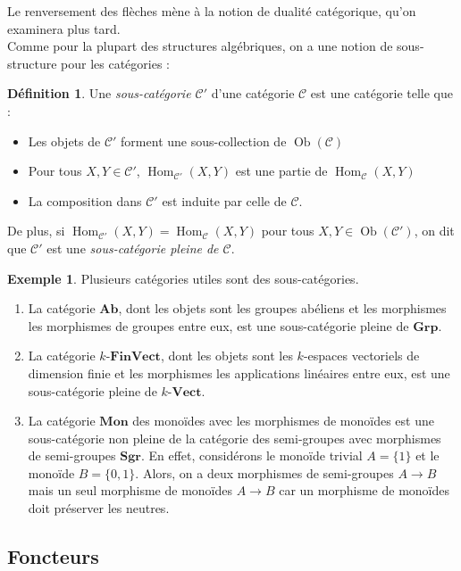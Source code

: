\documentclass{article}
\newcommand{\cat}{\mathcal{C}}
\newcommand{\Grp}{\mathbf{Grp}}
\newcommand{\Ab}{\mathbf{Ab}}
\newcommand{\Vectcat}{\mathbf{Vect}}
\newcommand{\FinVectcat}{\mathbf{FinVect}}
\DeclareMathOperator{\Ob}{Ob}
\DeclareMathOperator{\Hom}{Hom}
\theoremstyle{plain}
\theoremstyle{definition}
\newtheorem{definition}[theorem]{Définition}
\newtheorem{example}[theorem]{Exemple}
\theoremstyle{remark}
\begin{document}
Le renversement des flèches mène à la notion de dualité catégorique, qu'on examinera plus tard. \\
Comme pour la plupart des structures algébriques, on a une notion de sous-structure pour les catégories :

\begin{definition}
    Une \emph{sous-catégorie $\cat'$} d'une catégorie $\cat$ est une catégorie telle que :
    \begin{itemize}
        \item Les objets de $\cat'$ forment une sous-collection de $\Ob(\cat)$
        \item Pour tous $X,Y \in \cat'$, $\Hom_{\cat'} (X,Y)$ est une partie de $\Hom_{\cat} (X,Y)$
        \item La composition dans $\cat'$ est induite par celle de $\cat$.
    \end{itemize}
    De plus, si $\Hom_{\cat'} (X,Y) = \Hom_{\cat} (X,Y)$ pour tous $X,Y \in \Ob(\cat')$, on dit que $\cat'$ est une \emph{sous-catégorie pleine de $\cat$}.
\end{definition}

\begin{example}
    Plusieurs catégories utiles sont des sous-catégories.
    \begin{enumerate}
        \item La catégorie $\Ab$, dont les objets sont les groupes abéliens et les morphismes les morphismes de groupes entre eux, est une sous-catégorie pleine de $\Grp$.
        \item La catégorie $k\text{-}\FinVectcat$, dont les objets sont les $k$-espaces vectoriels de dimension finie et les morphismes les applications linéaires entre eux, est une sous-catégorie pleine de $k\text{-}\Vectcat$.
        \item La catégorie $\mathbf{Mon}$ des monoïdes avec les morphismes de monoïdes est une sous-catégorie non pleine de la catégorie des semi-groupes avec morphismes de semi-groupes $\mathbf{Sgr}$. En effet, considérons le monoïde trivial $A = \{1\}$ et le monoïde $B = \{0,1\}$. Alors, on a deux morphismes de semi-groupes $A \to B$ mais un seul morphisme de monoïdes $A \to B$ car un morphisme de monoïdes doit préserver les neutres.
    \end{enumerate}
\end{example}

\subsection{Foncteurs}
\end{document}
